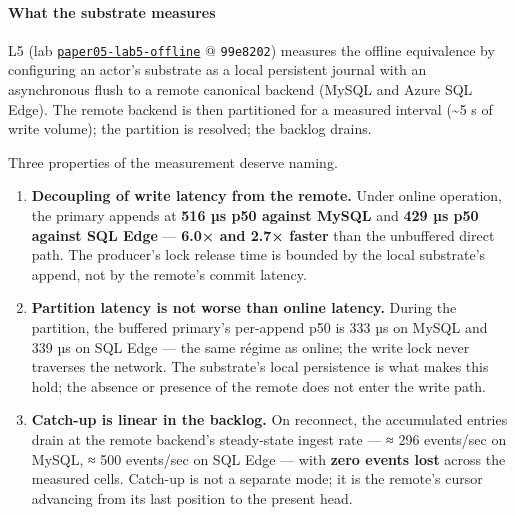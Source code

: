 \documentclass[
]{article}
\providecommand{\tightlist}{%
  \setlength{\itemsep}{0pt}\setlength{\parskip}{0pt}}
\begin{document}
\paragraph{What the substrate
measures}\label{what-the-substrate-measures-2}

L5 (lab \href{data/paper05-lab5-offline/}{\texttt{paper05-lab5-offline}}
@ \texttt{99e8202}) measures the offline equivalence by configuring an
actor's substrate as a local persistent journal with an asynchronous
flush to a remote canonical backend (MySQL and Azure SQL Edge). The
remote backend is then partitioned for a measured interval
(\textasciitilde5 s of write volume); the partition is resolved; the
backlog drains.

Three properties of the measurement deserve naming.

\begin{enumerate}
\def\labelenumi{\arabic{enumi}.}
\tightlist
\item
  \textbf{Decoupling of write latency from the remote.} Under online
  operation, the primary appends at \textbf{516 µs p50 against MySQL}
  and \textbf{429 µs p50 against SQL Edge} --- \textbf{6.0× and 2.7×
  faster} than the unbuffered direct path. The producer's lock release
  time is bounded by the local substrate's append, not by the remote's
  commit latency.
\item
  \textbf{Partition latency is not worse than online latency.} During
  the partition, the buffered primary's per-append p50 is 333 µs on
  MySQL and 339 µs on SQL Edge --- the same régime as online; the write
  lock never traverses the network. The substrate's local persistence is
  what makes this hold; the absence or presence of the remote does not
  enter the write path.
\item
  \textbf{Catch-up is linear in the backlog.} On reconnect, the
  accumulated entries drain at the remote backend's steady-state ingest
  rate --- ≈ 296 events/sec on MySQL, ≈ 500 events/sec on SQL Edge ---
  with \textbf{zero events lost} across the measured cells. Catch-up is
  not a separate mode; it is the remote's cursor advancing from its last
  position to the present head.
\end{enumerate}
\end{document}
